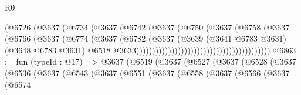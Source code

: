 \begin{lexlean}{R0}
\begin{coremodule}
                                                      (@6726
                                                        (@3637
                                                          (@6734
                                                            (@3637
                                                              (@6742
                                                                (@3637
                                                                  (@6750
                                                                    (@3637
                                                                      (@6758
                                                                        (@3637
                                                                          (@6766
                                                                            (@3637
                                                                              (@6774
                                                                                (@3637
                                                                                  (@6782
                                                                                    (@3637
                                                                                      (@3639
                                                                                        (@3641
                                                                                          @6783
                                                                                          @3631)
                                                                                        (@3648
                                                                                          @6783
                                                                                          @3631)
                                                                                        @6518
                                                                                        @3633))))))))))))))))))))))))))))))))))))))))))
@6863 := fun (typeId : @17) =>
  @3637
    (@6519
      (@3637
        (@6527
          (@3637
            (@6528
              (@3637
                (@6536
                  (@3637
                    (@6543
                      (@3637
                        (@6551
                          (@3637
                            (@6558
                              (@3637
                                (@6566
                                  (@3637
                                    (@6574

\end{coremodule}
\end{lexlean}

